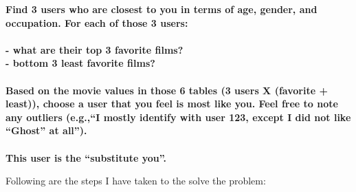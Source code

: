 \textbf{Find 3 users who are closest to you in terms of age, gender, and occupation.  For each of those 3 users:}\\\\
\textbf{- what are their top 3 favorite films?}\\
\textbf{- bottom 3 least favorite films?}\\\\
\textbf{Based on the movie values in those 6 tables (3 users X (favorite + least)), choose a user that you feel is most like you.  Feel free to note any outliers (e.g.,``I mostly identify with user 123, except I did not like ``Ghost'' at all''). }\\\\
\textbf {This user is the ``substitute you''.  }

Following are the steps I have taken to the solve the problem:
